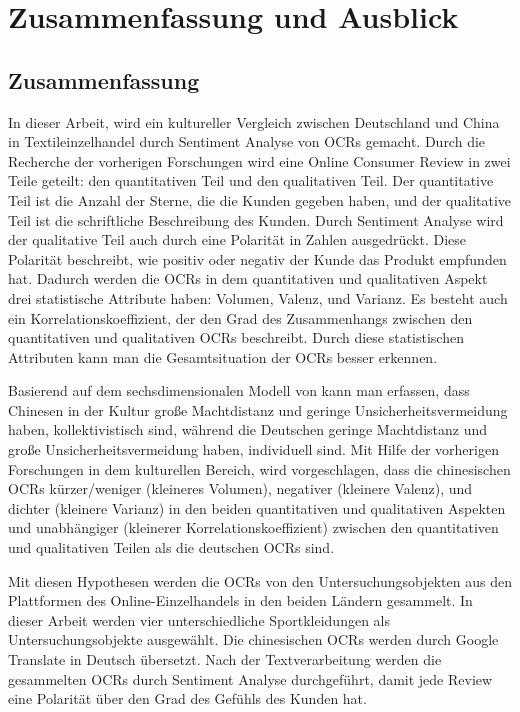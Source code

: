 \chapter{Zusammenfassung und Ausblick}
\section{Zusammenfassung}
In dieser Arbeit, wird ein kultureller Vergleich zwischen Deutschland und China in Textileinzelhandel durch Sentiment Analyse von \acl{OCRs} gemacht. Durch die Recherche der vorherigen Forschungen wird eine Online Consumer Review in zwei Teile geteilt: den quantitativen Teil und den qualitativen Teil. Der quantitative Teil ist die Anzahl der Sterne, die die Kunden gegeben haben, und der qualitative Teil ist die schriftliche Beschreibung des Kunden. Durch Sentiment Analyse wird der qualitative Teil auch durch eine Polarität in Zahlen ausgedrückt. Diese Polarität beschreibt, wie positiv oder negativ der Kunde das Produkt empfunden hat. Dadurch werden die \ac{OCRs} in dem quantitativen und qualitativen Aspekt drei statistische Attribute haben: Volumen, Valenz, und Varianz. Es besteht auch ein Korrelationskoeffizient, der den Grad des Zusammenhangs zwischen den quantitativen und qualitativen \ac{OCRs} beschreibt. Durch diese statistischen Attributen kann man die Gesamtsituation der \ac{OCRs} besser erkennen.

Basierend auf dem sechsdimensionalen Modell von \citeauthor{hofstede2013interkulturelle} kann man erfassen, dass Chinesen in der Kultur große Machtdistanz und geringe Unsicherheitsvermeidung haben, kollektivistisch sind, während die Deutschen geringe Machtdistanz und große Unsicherheitsvermeidung haben, individuell sind. Mit Hilfe der vorherigen Forschungen in dem kulturellen Bereich, wird vorgeschlagen, dass die chinesischen \ac{OCRs} kürzer/weniger (kleineres Volumen), negativer (kleinere Valenz), und dichter (kleinere Varianz) in den beiden quantitativen und qualitativen Aspekten und unabhängiger (kleinerer Korrelationskoeffizient) zwischen den quantitativen und qualitativen Teilen als die deutschen \ac{OCRs} sind.

Mit diesen Hypothesen werden die \ac{OCRs} von den Untersuchungsobjekten aus den Plattformen des Online-Einzelhandels in den beiden Ländern gesammelt. In dieser Arbeit werden vier unterschiedliche Sportkleidungen als Untersuchungsobjekte ausgewählt. Die chinesischen \ac{OCRs} werden durch Google Translate in Deutsch übersetzt. Nach der Textverarbeitung werden die gesammelten \ac{OCRs} durch Sentiment Analyse durchgeführt, damit jede Review eine Polarität über den Grad des Gefühls des Kunden hat. 

